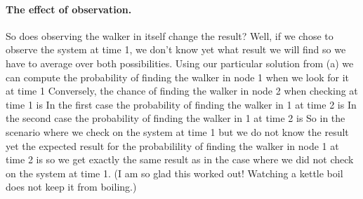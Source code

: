 \paragraph{The effect of observation.}So does observing the walker in itself change the result? Well, if we chose to observe the system at time 1, we don't know yet what result we will find so we have to average over both possibilities.
Using our particular solution from (a) we can compute the probability of finding the walker in node 1 when we look for it at time 1 
Conversely, the chance of finding the walker in node 2 when checking at time 1 is 
In the first case the probability of finding the walker in 1 at time 2 is 
In the second case the probability of finding the walker in 1 at time 2 is 
So in the scenario where we check on the system at time 1 but we do not know the result yet the expected result for the probabilility of finding the walker in node 1 at time 2 is 
so we get exactly the same result as in the case where we did not check on the system at time 1. (I am so glad this worked out! Watching a kettle boil does not keep it from boiling.) 
